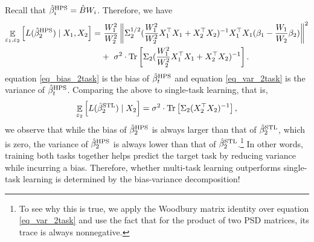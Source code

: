 \iffalse
Recall that $\hat{\beta}_i^{\textup{HPS}} = \hat{B} W_i$. Therefore, we have
\begin{align}
	\mathop{\mathbb{E}}_{\varepsilon_1, \varepsilon_2}\left[ L(\hat{\beta}_2^{\textup{HPS}}) \mid X_1, X_2 \right]
	=&~ \frac{W_1^2}{W_2^2} \left\| \Sigma_2^{1/2}(\frac{W_1^2}{W_2^2} X_1^{\top}X_1 + X_2^{\top}X_2)^{-1} X_1^{\top}X_1 (\beta_1 - \frac{W_1}{W_2} \beta_2) \right\|^2 \label{eq_bias_2task} \\
			&+~  \sigma^2\cdot \operatorname{Tr}\left[\Sigma_2(\frac{W_1^2}{W_2^2} X_1^{\top}X_1 + X_2^{\top}X_2)^{-1} \right]. \label{eq_var_2task}
\end{align}
equation \eqref{eq_bias_2task} is the bias of $\hat{\beta}_t^{\textup{HPS}}$ and
equation \eqref{eq_var_2task} is the variance of $\hat{\beta}_t^{\textup{HPS}}$.
Comparing the above to single-task learning, that is,
\begin{align}
	\mathop{\mathbb{E}}_{\varepsilon_2}\left[ L(\hat{\beta}_2^{\textup{STL}}) \mid X_2 \right] = \sigma^2 \cdot \operatorname{Tr}\left[\Sigma_2 (X_2^{\top} X_2)^{-1}\right], \label{eq_var_stl}
\end{align}
we observe that while the bias of $\hat{\beta}_2^{\textup{HPS}}$ is always larger than that of $\hat{\beta}_2^{\textup{STL}}$, which is zero, the variance of $\hat{\beta}_2^{\textup{HPS}}$ is always lower than that of $\hat{\beta}_2^{\textup{STL}}$.\footnote{To see why this is true, we apply the Woodbury matrix identity over equation \eqref{eq_var_2task} and use the fact that for the product of two PSD matrices, its trace is always nonnegative.}
In other words, training both tasks together helps predict the target task by reducing variance while incurring a bias.
Therefore, whether multi-task learning outperforms single-task learning is determined by the bias-variance decomposition!

